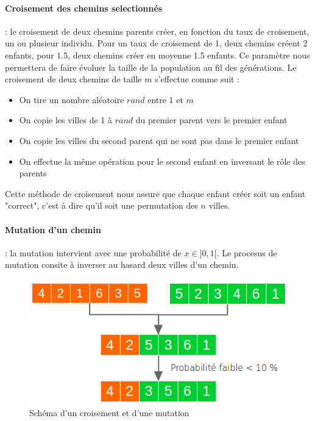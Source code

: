 \documentclass{article}
\begin{document}
    \paragraph{Croisement des chemins selectionnés}: le croisement de deux chemins parents créer, en fonction du taux de croisement, un ou plusieur individu. Pour un taux de croisement de 1, deux chemins créent 2 enfants, pour 1.5, deux chemins créer en moyenne 1.5 enfants. Ce paramètre nous permettera de faire évoluer la taille de la population au fil des générations.
    Le croisement de deux chemins de taille $m$ s'effectue comme suit :
    \begin{itemize}
    	\item On tire un nombre aléatoire $rand$ entre 1 et $m$
    	\item On copie les villes de 1 à $rand$ du premier parent vers le premier enfant
    	\item On copie les villes du second parent qui ne sont pas dans le premier enfant
    	\item On effectue la même opération pour le second enfant en inversant le rôle des parents
    \end{itemize}

    Cette méthode de croisement nous assure que chaque enfant créer soit un enfant "correct", c'est à dire qu'il soit une permutation des $n$ villes.

    \paragraph{Mutation d'un chemin}: la mutation intervient avec une probabilité de $x \in ]0, 1[$. Le procesus de mutation consite à inverser au hasard deux villes d'un chemin.

	\begin{figure}
		\begin{center}
			\includegraphics[scale=0.5]{croisement.png}
		\end{center}

		\caption{Schéma d'un croisement et d'une mutation}

		\label{Schéma d'un croisement et d'une mutation}
	\end{figure}
\end{document}

